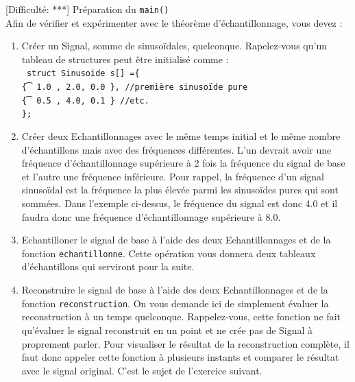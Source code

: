 \documentclass[11pt]{article}
\begin{document}
\textcolor{mygreen}{[Difficulté: ***]} Préparation du \texttt{main()}\\
Afin de vérifier et expérimenter avec le théorème d'échantillonnage, vous devez :
\begin{enumerate}

\item Créer un Signal, somme de sinusoïdales, quelconque. Rapelez-vous qu'un tableau de structures peut être initialisé comme :\\
\texttt{
struct Sinusoide s[] =\{\\
    \t\{ 1.0 , 2.0, 0.0 \}, //première sinusoïde pure\\
    \t\{ 0.5 , 4.0, 0.1 \}  //etc.\\
   \};\\}

\item Créer deux Echantillonnages avec le même temps initial et le même nombre d'échantillons mais avec des fréquences différentes. 
L'un devrait avoir une fréquence d'échantillonnage supérieure à 2 fois la fréquence du signal de base et l'autre une fréquence inférieure. Pour rappel, la fréquence d'un signal sinusoïdal est la fréquence la plus élevée parmi les sinusoïdes pures qui sont sommées. 
Dans l'exemple ci-dessus, le fréquence du signal est donc 4.0 et il faudra donc une fréquence d'échantillonnage supérieure à 8.0.

\item Echantilloner le signal de base à l'aide des deux Echantillonnages et de la fonction \texttt{echantillonne}. Cette opération vous donnera deux tableaux d'échantillons qui serviront pour la suite.

\item Reconstruire le signal de base à l'aide des deux Echantillonnages et de la fonction \texttt{reconstruction}. On vous demande ici de simplement évaluer la reconstruction à un temps quelconque.
Rappelez-vous, cette fonction ne fait qu'évaluer le signal reconstruit en un point et ne crée pas de Signal à proprement parler. Pour visualiser le résultat de la reconstruction complète, il faut donc appeler cette fonction à plusieurs instants et comparer le résultat avec le signal original. C'est le sujet de l'exercice suivant. 
\end{enumerate}
\end{document}

